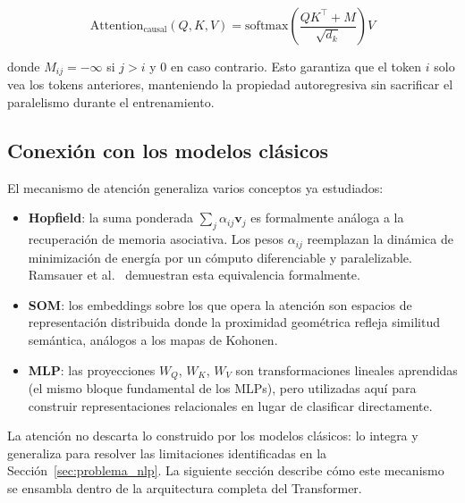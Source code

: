 \begin{equation}
    \text{Attention}_{\text{causal}}(Q,K,V) =
    \text{softmax}\!\left(\frac{QK^{\top} + M}{\sqrt{d_k}}\right) V
\end{equation}

\noindent donde $M_{ij} = -\infty$ si $j > i$ y $0$ en caso contrario.
Esto garantiza que el token $i$ solo vea los tokens anteriores, manteniendo
la propiedad autoregresiva sin sacrificar el paralelismo durante el
entrenamiento.

\subsection{Conexión con los modelos clásicos}
\label{subsec:atencion_conexion}

El mecanismo de atención generaliza varios conceptos ya estudiados:

\begin{itemize}
    \item \textbf{Hopfield}: la suma ponderada $\sum_j \alpha_{ij} \bm{v}_j$
    es formalmente análoga a la recuperación de memoria asociativa. Los
    pesos $\alpha_{ij}$ reemplazan la dinámica de minimización de energía
    por un cómputo diferenciable y paralelizable. Ramsauer et
    al.~\cite{ramsauer2020hopfield} demuestran esta equivalencia formalmente.

    \item \textbf{SOM}: los embeddings sobre los que opera la atención son
    espacios de representación distribuida donde la proximidad geométrica
    refleja similitud semántica, análogos a los mapas de Kohonen.

    \item \textbf{MLP}: las proyecciones $W_Q$, $W_K$, $W_V$ son
    transformaciones lineales aprendidas (el mismo bloque fundamental
    de los MLPs), pero utilizadas aquí para construir representaciones
    relacionales en lugar de clasificar directamente.
\end{itemize}

La atención no descarta lo construido por los modelos clásicos: lo integra
y generaliza para resolver las limitaciones identificadas en la
Sección~\ref{sec:problema_nlp}. La siguiente sección describe cómo este
mecanismo se ensambla dentro de la arquitectura completa del Transformer.
